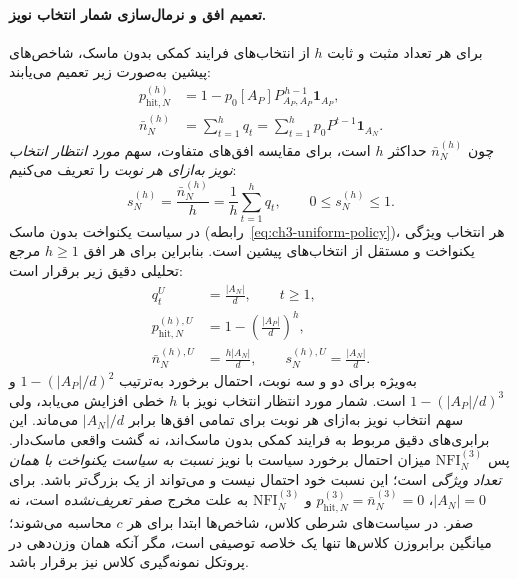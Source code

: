 \paragraph{تعمیم افق و نرمال‌سازی شمار انتخاب نویز.}
برای هر تعداد مثبت و ثابت $h$ از انتخاب‌های
فرایند کمکی بدون ماسک، شاخص‌های پیشین
به‌صورت زیر تعمیم می‌یابند:
\begin{equation}\label{eq:ch3-noise-general-horizon}
\boxed{
\begin{aligned}
p_{\mathrm{hit},N}^{(h)}
&=1-p_0[A_P]P_{A_P,A_P}^{\,h-1}\mathbf 1_{A_P},\\
\bar n_N^{(h)}
&=\sum_{t=1}^{h}q_t
=\sum_{t=1}^{h}p_0P^{t-1}\mathbf 1_{A_N}.
\end{aligned}}
\end{equation}
چون $\bar n_N^{(h)}$ حداکثر $h$ است،
برای مقایسه افق‌های متفاوت، سهم
\emph{مورد انتظار انتخاب نویز به‌ازای هر نوبت}
را تعریف می‌کنیم:
\begin{equation}\label{eq:ch3-noise-normalized-expectation}
\boxed{
s_N^{(h)}=\frac{\bar n_N^{(h)}}{h}
=\frac1h\sum_{t=1}^{h}q_t,\qquad
0\le s_N^{(h)}\le1.
}
\end{equation}
در سیاست یکنواخت بدون ماسک
(رابطه~\eqref{eq:ch3-uniform-policy})،
هر انتخاب ویژگی یکنواخت و
مستقل از انتخاب‌های پیشین است.
بنابراین برای هر افق $h\ge1$
مرجع تحلیلی دقیق زیر برقرار است:
\begin{equation}\label{eq:ch3-noise-uniform-reference}
\boxed{
\begin{aligned}
q_t^U&=\frac{|A_N|}{d},\qquad t\ge1,\\
p_{\mathrm{hit},N}^{(h),U}
&=1-\left(\frac{|A_P|}{d}\right)^h,\\
\bar n_N^{(h),U}&=\frac{h|A_N|}{d},
\qquad s_N^{(h),U}=\frac{|A_N|}{d}.
\end{aligned}}
\end{equation}
به‌ویژه برای دو و سه نوبت،
احتمال برخورد به‌ترتیب
$1-(|A_P|/d)^2$
و $1-(|A_P|/d)^3$ است.
شمار مورد انتظار انتخاب نویز
با $h$ خطی افزایش می‌یابد،
ولی سهم انتخاب نویز به‌ازای
هر نوبت برای تمامی افق‌ها
برابر $|A_N|/d$ می‌ماند.
این برابری‌های دقیق مربوط
به فرایند کمکی بدون ماسک‌اند،
نه گشت واقعی ماسک‌دار.
پس $\mathrm{NFI}_N^{(3)}$ میزان احتمال برخورد سیاست با نویز
\emph{نسبت به سیاست یکنواخت با همان تعداد ویژگی} است؛
این نسبت خود احتمال نیست و می‌تواند از یک بزرگ‌تر باشد.
برای $|A_N|=0$، $p_{\mathrm{hit},N}^{(3)}
=\bar n_N^{(3)}=0$ و $\mathrm{NFI}_N^{(3)}$ به علت مخرج
صفر \emph{تعریف‌نشده} است، نه صفر.
در سیاست‌های شرطی کلاس، شاخص‌ها ابتدا برای هر
$c$ محاسبه می‌شوند؛ میانگین برابر‌وزن کلاس‌ها
تنها یک خلاصه توصیفی است، مگر آنکه همان وزن‌دهی
در پروتکل نمونه‌گیری کلاس نیز برقرار باشد.

